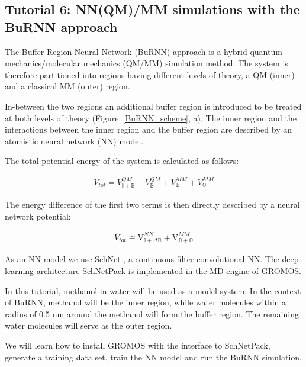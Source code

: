 
\subsection{Tutorial 6: NN(QM)/MM simulations with the BuRNN approach}
The Buffer Region Neural Network (BuRNN) approach \cite{Lier2022BuRNN} is a hybrid quantum mechanics/molecular mechanics (QM/MM) \cite{Warshel1976QM/MM, Senn2009QM/MM} simulation method. The system is therefore partitioned into regions having different levels of theory, a QM (inner) and a classical MM (outer) region. 

In-between the two regions an additional buffer region is introduced to be treated at both levels of theory (Figure~\ref{BuRNN_scheme}, a). The inner region and the interactions between the inner region and the buffer region are described by an atomistic neural network (NN) model.

The total potential energy of the system is calculated as follows:

\begin{equation}
  \begin{aligned}
  V_{tot} = V^{QM}_{\mathbb{I+B}} - V^{QM}_{\mathbb{B}} + V^{MM}_{\mathbb{B}} + V^{MM}_{\mathbb{O}}
    \end{aligned}
\end{equation}

 The energy difference of the first two terms is then directly described by a neural network potential: 
 
\begin{equation}
  \begin{aligned}
  V_{tot} \cong \mathrm{V}_{\mathbb{I+}\Delta\mathbb{B}}^{NN} + \mathrm{V}_{\mathbb{B+O}}^{MM}
    \end{aligned}
\end{equation}

As an NN model we use SchNet \cite{Schuett2017SchNet, Schuett2018SchNet}, a continuous filter convolutional NN. The deep learning architecture SchNetPack \cite{Schuett2019SPK} is implemented in the MD engine of GROMOS.


In this tutorial, methanol in water will be used as a model system. In the context of BuRNN, methanol will be the inner region, while water molecules within a radius of 0.5 nm around the methanol will form the buffer region. The remaining water molecules will serve as the outer region. 

We will learn how to install GROMOS with the interface to SchNetPack, generate a training data set, train the NN model and run the BuRNN simulation.

